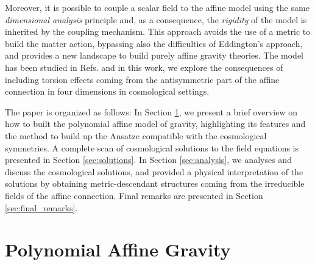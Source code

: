 Moreover, it is possible to couple a scalar field to the affine model using the same \textit{dimensional analysis} principle and, as a consequence, the \textit{rigidity} of the model is inherited by the coupling mechanism. This approach avoids the use of a metric to build the matter action, bypassing also the difficulties of Eddington's approach, and provides a new landscape to build purely affine gravity theories. The model has been studied in Refs.\cite{castillofelisola2016polynomial,castillofelisola2016einsteins,castillofelisola2019cosmological,Castillo_Felisola_2018,Castillo_Felisola_2020,Castillo_Felisola_2022_EPJC,Castillo_Felisola_2022_Universe} and in this work, we explore the consequences of including torsion effects coming from the antisymmetric part of the affine connection in four dimensions in cosmological settings.

The paper is organized as follows: In Section \ref{sec:PAG}, we present a brief overview on how to built the polynomial affine model of gravity, highlighting 
its features and the method to build up the Ansatze compatible with the cosmological symmetries. A complete scan of cosmological solutions to the field equations is presented in Section \ref{sec:solutions}. In Section \ref{sec:analysis}, we analyses and discuss the cosmological solutions, and provided a physical interpretation of the solutions by obtaining metric-descendant structures coming
from the irreducible fields of the affine connection. Final remarks are presented in Section \ref{sec:final_remarks}. 

\section{Polynomial Affine Gravity}
\label{sec:PAG}

